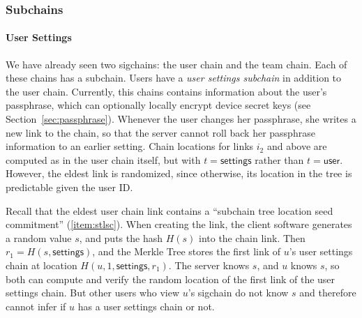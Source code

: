 \subsubsection{Subchains}
\label{sec:subchains}

\newcommand{\user}{\textsf{user}}
\newcommand{\settings}{\textsf{settings}}
\newcommand{\teamMembership}{\textsf{teamMembership}}

\paragraph{User Settings}
We have already seen two sigchains: the user chain and the team chain. Each of
these chains has a subchain. Users have a \textit{user settings subchain} in
addition to the user chain. Currently, this chains contains information about
the user's passphrase, which can optionally locally encrypt device secret
keys (see Section~\ref{sec:passphrase}). Whenever the user changes her
passphrase, she writes a new link to the chain, so that the server cannot roll
back her passphrase information to an earlier setting.  Chain locations for
links $i_2$ and above are computed as in the user chain itself, but with $t =
\settings$ rather than $t = \user$.  However, the eldest link is randomized,
since otherwise, its location in the tree is predictable given the user ID.

Recall that the eldest user chain link contains a ``subchain tree location seed
commitment'' (\ref{item:stlsc}). When creating the link, the client software
generates a random value $s$, and puts the hash $H(s)$ into the chain link.
Then $r_1 = H(s, \settings)$, and the Merkle Tree stores the first link of 
$u$'s user settings chain at location $H(u, 1, \settings, r_1)$. The server knows 
$s$, and $u$ knows $s$, so both can compute and verify the random location of 
the first link of the user settings chain. But other users who view $u$'s
sigchain do not know $s$ and therefore cannot infer if $u$ has a user
settings chain or not.

